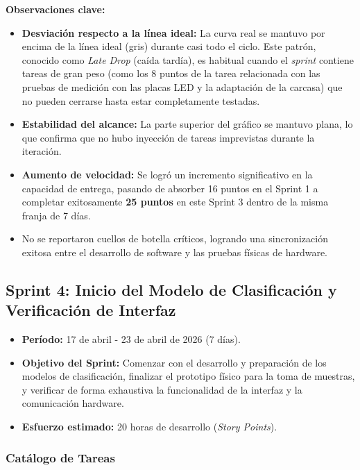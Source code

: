 
\noindent\textbf{Observaciones clave:}
\begin{itemize}
    \item \textbf{Desviación respecto a la línea ideal:} La curva real se mantuvo por encima de la línea ideal (gris) durante casi todo el ciclo. Este patrón, conocido como \textit{Late Drop} (caída tardía), es habitual cuando el \textit{sprint} contiene tareas de gran peso (como los 8 puntos de la tarea relacionada con las pruebas de medición con las placas LED y la adaptación de la carcasa) que no pueden cerrarse hasta estar completamente testadas.
    \item \textbf{Estabilidad del alcance:} La parte superior del gráfico se mantuvo plana, lo que confirma que no hubo inyección de tareas imprevistas durante la iteración.
    \item \textbf{Aumento de velocidad:} Se logró un incremento significativo en la capacidad de entrega, pasando de absorber 16 puntos en el Sprint 1 a completar exitosamente \textbf{25 puntos} en este Sprint 3 dentro de la misma franja de 7 días.
    \item No se reportaron cuellos de botella críticos, logrando una sincronización exitosa entre el desarrollo de software y las pruebas físicas de hardware.
\end{itemize}

\subsection{Sprint 4: Inicio del Modelo de Clasificación y Verificación de Interfaz}

\begin{itemize}
    \item \textbf{Período:} 17 de abril - 23 de abril de 2026 (7 días).
    \item \textbf{Objetivo del Sprint:} Comenzar con el desarrollo y preparación de los modelos de clasificación, finalizar el prototipo físico para la toma de muestras, y verificar de forma exhaustiva la funcionalidad de la interfaz y la comunicación hardware.
    \item \textbf{Esfuerzo estimado:} 20 horas de desarrollo (\textit{Story Points}).
\end{itemize}

\subsubsection{Catálogo de Tareas}


